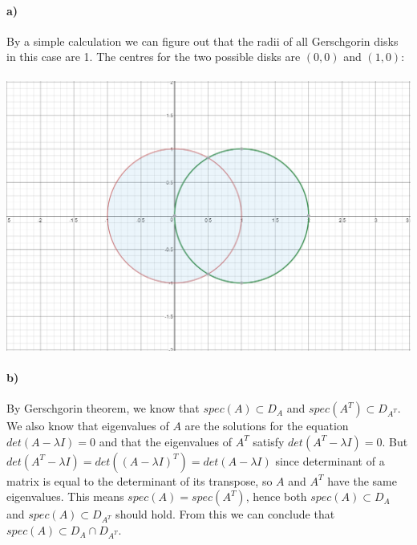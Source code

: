 \documentclass[10pt,letter]{article}
\begin{document}
\paragraph{a)} By a simple calculation we can figure out that the radii of all Gerschgorin disks in this case are 1. The centres for the two possible disks are $(0, 0)$ and $(1, 0)$:
\\\\
\includegraphics[width=\textwidth,height=\textheight,keepaspectratio]{ps5problem5a.png}

\pagebreak

\paragraph{b)} By Gerschgorin theorem, we know that $spec(A) \subset D_A$ and $spec(A^T) \subset D_{A^T}$. We also know that eigenvalues of $A$ are the solutions for the equation $det(A - \lambda I) = 0$ and that the eigenvalues of $A^T$ satisfy $det(A^T - \lambda I) = 0$. But $det(A^T - \lambda I) = det((A - \lambda I)^T) = det(A - \lambda I)$ since determinant of a matrix is equal to the determinant of its transpose, so $A$ and $A^T$ have the same eigenvalues. This means $spec(A) = spec(A^T)$, hence both  $spec(A) \subset D_A$ and $spec(A) \subset D_{A^T}$ should hold. From this we can conclude that  $spec(A) \subset D_A \cap D_{A^T}$.
\end{document}
